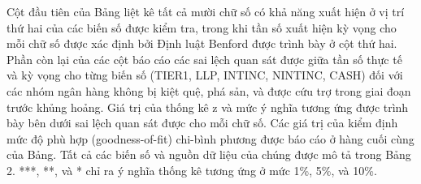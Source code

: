 Cột đầu tiên của Bảng liệt kê tất cả mười chữ số có khả năng xuất hiện ở vị trí thứ hai của các biến số được kiểm tra, trong khi tần số xuất hiện kỳ vọng cho mỗi chữ số được xác định bởi Định luật Benford được trình bày ở cột thứ hai. Phần còn lại của các cột báo cáo các sai lệch quan sát được giữa tần số thực tế và kỳ vọng cho từng biến số (TIER1, LLP, INTINC, NINTINC, CASH) đối với các nhóm ngân hàng không bị kiệt quệ, phá sản, và được cứu trợ trong giai đoạn trước khủng hoảng. Giá trị của thống kê z và mức ý nghĩa tương ứng được trình bày bên dưới sai lệch quan sát được cho mỗi chữ số. Các giá trị của kiểm định mức độ phù hợp (goodness-of-fit) chi-bình phương được báo cáo ở hàng cuối cùng của Bảng. Tất cả các biến số và nguồn dữ liệu của chúng được mô tả trong Bảng 2. ***, **, và * chỉ ra ý nghĩa thống kê tương ứng ở mức 1\%, 5\%, và 10\%.

